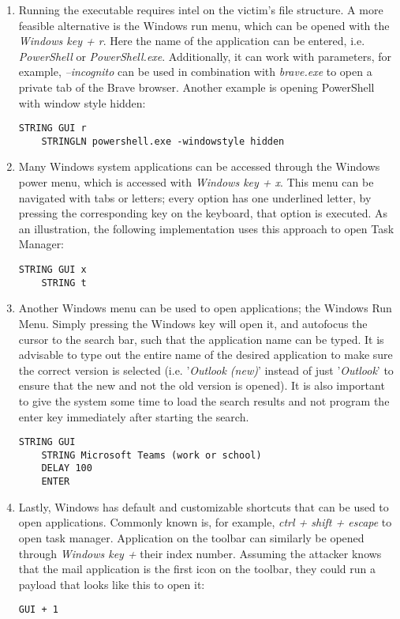 \begin{enumerate}
    \item Running the executable requires intel on the victim's file structure. A more feasible alternative is the Windows run menu, which can be opened with the \textit{Windows key + r}. Here the name of the application can be entered, i.e. \textit{PowerShell} or \textit{PowerShell.exe}. Additionally, it can work with parameters, for example, \textit{--incognito} can be used in combination with \textit{brave.exe} to open a private tab of the Brave browser. Another example is opening PowerShell with window style hidden:
    \begin{lstlisting}[caption={Open PowerShell in a hidden window with Windows Run Menu},captionpos=b]
    STRING GUI r
    STRINGLN powershell.exe -windowstyle hidden
    \end{lstlisting}
    \item Many Windows system applications can be accessed through the Windows power menu, which is accessed with \textit{Windows key + x}. This menu can be navigated with tabs or letters; every option has one underlined letter, by pressing the corresponding key on the keyboard, that option is executed. As an illustration, the following implementation uses this approach to open Task Manager:
    \begin{lstlisting}[caption={Open PowerShell with Windows Power User Menu}, captionpos=b]
    STRING GUI x
    STRING t
    \end{lstlisting}
    \item Another Windows menu can be used to open applications; the Windows Run Menu. Simply pressing the Windows key will open it, and autofocus the cursor to the search bar, such that the application name can be typed. It is advisable to type out the entire name of the desired application to make sure the correct version is selected (i.e. '\textit{Outlook (new)}' instead of just '\textit{Outlook}' to ensure that the new and not the old version is opened). It is also important to give the system some time to load the search results and not program the enter key immediately after starting the search.
    \begin{lstlisting}[caption={Open Teams through Windows Run Menu}, captionpos=b]
    STRING GUI
    STRING Microsoft Teams (work or school)
    DELAY 100
    ENTER
    \end{lstlisting}
    \item Lastly, Windows has default and customizable shortcuts that can be used to open applications. Commonly known is, for example, \textit{ctrl + shift + escape} to open task manager. Application on the toolbar can similarly be opened through \textit{Windows key +} their index number. Assuming the attacker knows that the mail application is the first icon on the toolbar, they could run a payload that looks like this to open it:
    \begin{lstlisting}[caption={Open the first item on the toolbar}, captionpos=b]
    GUI + 1
    \end{lstlisting}
\end{enumerate}

